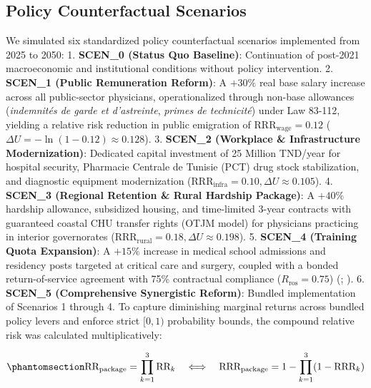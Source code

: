 \documentclass[
  11pt,
  a4paper]{article}
\begin{document}
\subsection{Policy Counterfactual
Scenarios}\label{sec-methods-scenarios}

We simulated six standardized policy counterfactual scenarios
implemented from 2025 to 2050: 1. \textbf{SCEN\_0 (Status Quo
Baseline)}: Continuation of post-2021 macroeconomic and institutional
conditions without policy intervention. 2. \textbf{SCEN\_1 (Public
Remuneration Reform)}: A \(+30\%\) real base salary increase across all
public-sector physicians, operationalized through non-base allowances
(\emph{indemnités de garde et d'astreinte}, \emph{primes de technicité})
under Law 83-112, yielding a relative risk reduction in public
emigration of \(\text{RRR}_{\text{wage}} = 0.12\)
(\(\Delta U = -\ln(1 - 0.12) \approx 0.128\)). 3. \textbf{SCEN\_2
(Workplace \& Infrastructure Modernization)}: Dedicated capital
investment of 25 Million TND/year for hospital security, Pharmacie
Centrale de Tunisie (PCT) drug stock stabilization, and diagnostic
equipment modernization
(\(\text{RRR}_{\text{infra}} = 0.10, \Delta U \approx 0.105\)). 4.
\textbf{SCEN\_3 (Regional Retention \& Rural Hardship Package)}: A
\(+40\%\) hardship allowance, subsidized housing, and time-limited
3-year contracts with guaranteed coastal CHU transfer rights (OTJM
model) for physicians practicing in interior governorates
(\(\text{RRR}_{\text{rural}} = 0.18, \Delta U \approx 0.198\)). 5.
\textbf{SCEN\_4 (Training Quota Expansion)}: A \(+15\%\) increase in
medical school admissions and residency posts targeted at critical care
and surgery, coupled with a bonded return-of-service agreement with 75\%
contractual compliance (\(R_{\text{ros}} = 0.75\))
(;
). 6. \textbf{SCEN\_5
(Comprehensive Synergistic Reform)}: Bundled implementation of Scenarios
1 through 4. To capture diminishing marginal returns across bundled
policy levers and enforce strict \([0, 1)\) probability bounds, the
compound relative risk was calculated multiplicatively:

\begin{equation}\protect\phantomsection\label{eq-compound-risk}{\text{RR}_{\text{package}} = \prod_{k=1}^{3} \text{RR}_k \quad \Longleftrightarrow \quad \text{RRR}_{\text{package}} = 1 - \prod_{k=1}^{3} (1 - \text{RRR}_k)}\end{equation}
\end{document}
